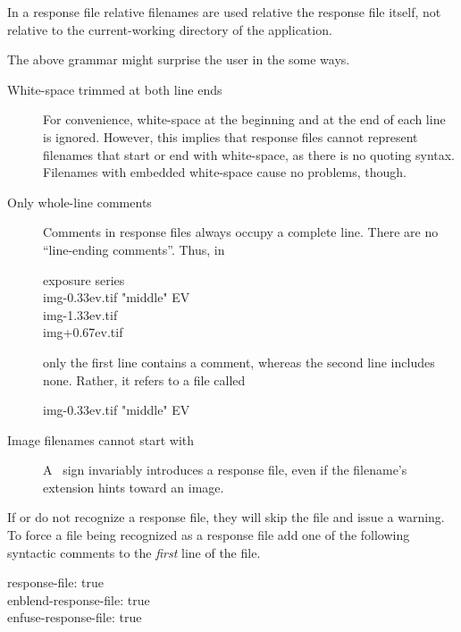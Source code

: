 In a response file relative filenames are used relative the response file itself, not relative
to the current-working directory of the application.

The above grammar might surprise the user in the some ways.

\begin{description}
\item[White-space trimmed at both line ends]\itemend
  For convenience, white-space at the beginning and at the end of each line is ignored.
  However, this implies that response files cannot represent filenames that start or end with
  white-space, as there is no quoting syntax.  Filenames with embedded white-space cause no
  problems, though.

\item[Only whole-line comments]\itemend
  Comments in response files always occupy a complete line.  There are no ``line-ending
  comments''.  Thus, in

  \begin{literal}
     exposure series \\
    img-0.33ev.tif  "middle" EV \\
    img-1.33ev.tif \\
    img+0.67ev.tif \\
  \end{literal}

  only the first line contains a comment, whereas the second line includes none.  Rather, it
  refers to a file called

  \begin{literal}
    img-0.33ev.tif  "middle" EV
  \end{literal}

\item[Image filenames cannot start with ]\itemend
  A ~sign invariably introduces a response file, even
  if the filename's extension hints toward an image.
\end{description}

%
If \App{} or \OtherApp{} do not recognize a response file, they will skip the file and issue a
warning.  To force a file being recognized as a response file add one of the following syntactic
comments to the \emph{first} line of the file.

\begin{literal}
  response-file: true \\
  enblend-response-file: true \\
  enfuse-response-file: true \\
\end{literal}

